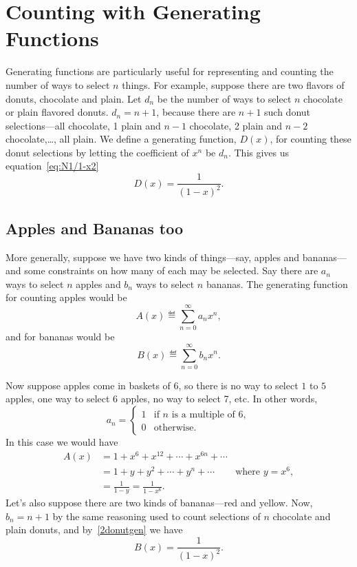 \section{Counting with Generating Functions}\label{sec:gf_counting}
Generating functions are particularly useful for representing and
counting the number of ways to select $n$ things.  For example,
suppose there are two flavors of donuts, chocolate and plain.  Let
$d_n$ be the number of ways to select $n$ chocolate or plain flavored
donuts.  $d_n =n+1$, because there are $n+1$ such donut
selections---all chocolate, 1 plain and $n-1$ chocolate, 2 plain and
$n-2$ chocolate,\dots, all plain.  We define a generating function,
$D(x)$, for counting these donut selections by letting the coefficient
of $x^n$ be $d_n$.  This gives us equation~\eqref{eq:N1/1-x2}
\begin{equation}\label{2donutgen}
D(x) = \frac{1}{(1-x)^2}.
\end{equation}

\subsection{Apples and Bananas too}
More generally, suppose we have two kinds of things---say, apples and
bananas---and some constraints on how many of each may be selected.
Say there are $a_n$ ways to select $n$ apples and $b_n$ ways to select
$n$ bananas.  The generating function for counting apples would be
\[
A(x) \eqdef \sum_{n=0}^\infty a_nx^n,
\]
and for bananas would be
\[
B(x) \eqdef \sum_{n=0}^\infty b_nx^n.
\]

Now suppose apples come in baskets of 6, so there is no way to select
$1$ to $5$ apples, one way to select 6 apples, no way to select 7,
etc.  In other words,
\[
a_n = \begin{cases}
      1 & \text{if $n$ is a multiple of 6},\\
      0 & \text{otherwise}.
\end{cases}
\]
In this case we would have
\begin{align*}
A(x)
& = 1 + x^6 + x^{12} + \cdots + x^{6n} + \cdots\\
& = 1 + y + y^2 + \cdots +y^n + \cdots
       & \text{where $y = x^6$},\\
& = \frac{1}{1 - y} = \frac{1}{1 - x^6}.
\end{align*}
Let's also suppose there are two kinds of bananas---red and yellow.
Now, $b_n = n+1$ by the same reasoning used to count selections of $n$
chocolate and plain donuts, and by~\eqref{2donutgen} we have
\[
B(x) = \frac{1}{(1-x)^2}.
\]

